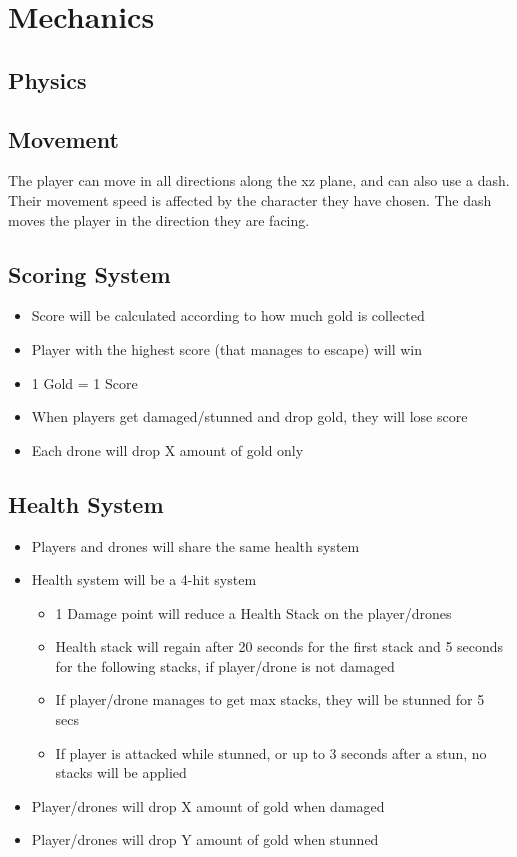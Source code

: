 \documentclass[11pt]{report}
\begin{document}
\section{Mechanics}
\subsection{Physics}
\subsection{Movement}

The player can move in all directions along the xz plane, and can also use a dash. Their movement speed is affected by the character they have chosen. The dash moves the player in the direction they are facing.

\subsection{Scoring System}
\begin{itemize}
    \item Score will be calculated according to how much gold is collected
    \item Player with the highest score (that manages to escape) will win
    \item 1 Gold = 1 Score
    \item When players get damaged/stunned and drop gold, they will lose score
    \item Each drone will drop X amount of gold only
\end{itemize}

\subsection{Health System}
\begin{itemize}
    \item Players and drones will share the same health system
    \item Health system will be a 4-hit system
    \begin{itemize}
        \item 1 Damage point will reduce a Health Stack on the player/drones
        \item Health stack will regain after 20 seconds for the first stack and 5 seconds for the following stacks, if player/drone is not damaged
        \item If player/drone manages to get max stacks, they will be stunned for 5 secs
        \item If player is attacked while stunned, or up to 3 seconds after a stun, no stacks will be applied
    \end{itemize}
    \item Player/drones will drop X amount of gold when damaged
    \item Player/drones will drop Y amount of gold when stunned
\end{itemize}
\end{document}
